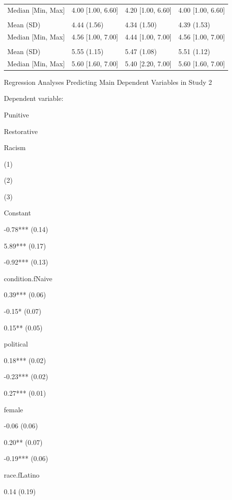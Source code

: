 \documentclass[
]{book}
\begin{document}
\begin{table}
\begin{tabular}[t]{llll}
\hspace{1em}Median [Min, Max] & 4.00 [1.00, 6.60] & 4.20 [1.00, 6.60] & 4.00 [1.00, 6.60]\\
\addlinespace[0.3em]
\multicolumn{4}{l}{\textbf{Perceived inequality}}\\
\hspace{1em}Mean (SD) & 4.44 (1.56) & 4.34 (1.50) & 4.39 (1.53)\\
\hspace{1em}Median [Min, Max] & 4.56 [1.00, 7.00] & 4.44 [1.00, 7.00] & 4.56 [1.00, 7.00]\\
\addlinespace[0.3em]
\multicolumn{4}{l}{\textbf{Egalitarianism}}\\
\hspace{1em}Mean (SD) & 5.55 (1.15) & 5.47 (1.08) & 5.51 (1.12)\\
\hspace{1em}Median [Min, Max] & 5.60 [1.60, 7.00] & 5.40 [2.20, 7.00] & 5.60 [1.60, 7.00]\\
\bottomrule
\end{tabular}
\end{table}

Regression Analyses Predicting Main Dependent Variables in Study 2

Dependent variable:

Punitive

Restorative

Racism

(1)

(2)

(3)

Constant

-0.78*** (0.14)

5.89*** (0.17)

-0.92*** (0.13)

condition.fNaive

0.39*** (0.06)

-0.15* (0.07)

0.15** (0.05)

political

0.18*** (0.02)

-0.23*** (0.02)

0.27*** (0.01)

female

-0.06 (0.06)

0.20** (0.07)

-0.19*** (0.06)

race.fLatino

0.14 (0.19)
\end{document}
